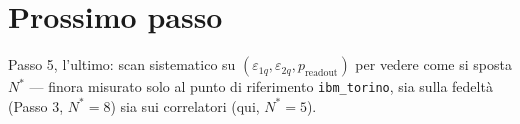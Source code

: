 \documentclass[11pt,a4paper]{article}
\begin{document}
\section*{Prossimo passo}

Passo 5, l'ultimo: scan sistematico su
$(\varepsilon_{1q},\varepsilon_{2q},p_\text{readout})$ per vedere come si
sposta $N^*$ --- finora misurato solo al punto di riferimento
\texttt{ibm\_torino}, sia sulla fedeltà (Passo 3, $N^*=8$) sia sui
correlatori (qui, $N^*=5$).
\end{document}
